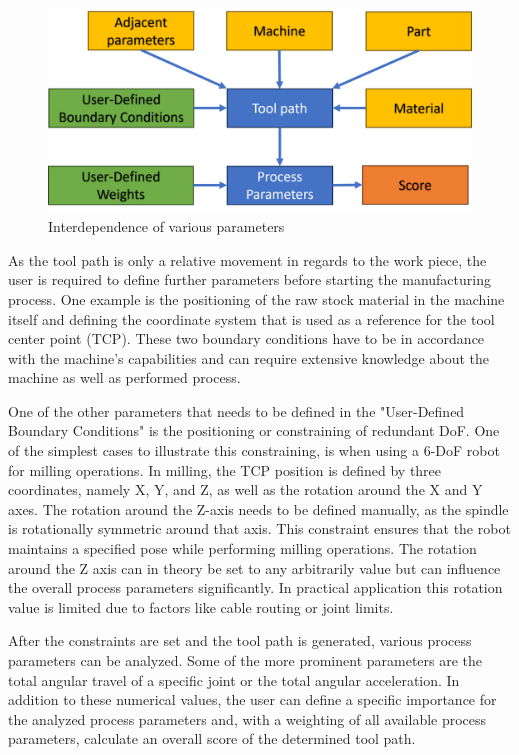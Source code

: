 \begin{figure}[H]
	\centerline{\includegraphics[scale=.6]{figures/BasicScore.png}}
	\caption{Interdependence of various parameters}
	\label{BasicScore}
\end{figure}

As the tool path is only a relative movement in regards to the work piece, the user is required to define further parameters before starting the manufacturing process. One example is the positioning of the raw stock material in the machine itself and defining the coordinate system that is used as a reference for the tool center point (TCP). These two boundary conditions have to be in accordance with the  machine's capabilities and can require extensive knowledge about the machine as well as performed process.

One of the other parameters that needs to be defined in the "User-Defined Boundary Conditions" is the positioning or constraining of redundant DoF. One of the simplest cases to illustrate this constraining, is when using a 6-DoF robot for milling operations. In milling, the TCP position is defined by three coordinates, namely X, Y, and Z, as well as the rotation around the X and Y axes. The rotation around the Z-axis needs to be defined manually, as the spindle is rotationally symmetric around that axis. This constraint ensures that the robot maintains a specified pose while performing milling operations. The rotation around the Z axis can in theory be set to any arbitrarily value but can influence the overall process parameters significantly. In practical application this rotation value is limited due to factors like cable routing or joint limits.  

After the constraints are set and the tool path is generated, various process parameters can be analyzed. Some of the more prominent parameters are the total angular travel of a specific joint or the total angular acceleration. In addition to these numerical values, the user can define a specific importance for the analyzed process parameters and, with a weighting of all available process parameters, calculate an overall score of the determined tool path.


